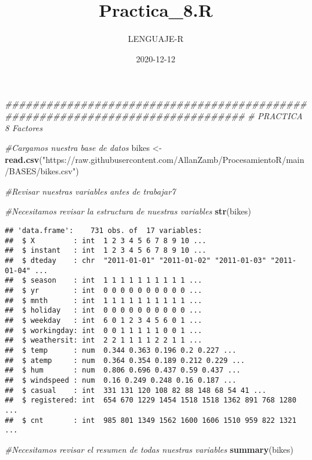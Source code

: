 \documentclass[
]{article}
\title{Practica\_8.R}
\author{LENGUAJE-R}
\date{2020-12-12}
\newenvironment{Shaded}{\begin{snugshade}}{\end{snugshade}}
\newcommand{\CommentTok}[1]{\textcolor[rgb]{0.56,0.35,0.01}{\textit{#1}}}
\newcommand{\KeywordTok}[1]{\textcolor[rgb]{0.13,0.29,0.53}{\textbf{#1}}}
\newcommand{\NormalTok}[1]{#1}
\newcommand{\StringTok}[1]{\textcolor[rgb]{0.31,0.60,0.02}{#1}}
\begin{document}
\maketitle

\begin{Shaded}
\begin{Highlighting}[]
\CommentTok{###############################################################################}
\CommentTok{# PRACTICA 8 Factores}

\CommentTok{#Cargamos nuestra base de datos}
\NormalTok{bikes <-}\StringTok{ }\KeywordTok{read.csv}\NormalTok{(}\StringTok{"https://raw.githubusercontent.com/AllanZamb/ProcesamientoR/main/BASES/bikes.csv"}\NormalTok{)}

\CommentTok{#Revisar nuestras variables antes de trabajar7}

\CommentTok{#Necesitamos revisar la estructura de nuestras variables}
\KeywordTok{str}\NormalTok{(bikes)}
\end{Highlighting}
\end{Shaded}

\begin{verbatim}
## 'data.frame':    731 obs. of  17 variables:
##  $ X         : int  1 2 3 4 5 6 7 8 9 10 ...
##  $ instant   : int  1 2 3 4 5 6 7 8 9 10 ...
##  $ dteday    : chr  "2011-01-01" "2011-01-02" "2011-01-03" "2011-01-04" ...
##  $ season    : int  1 1 1 1 1 1 1 1 1 1 ...
##  $ yr        : int  0 0 0 0 0 0 0 0 0 0 ...
##  $ mnth      : int  1 1 1 1 1 1 1 1 1 1 ...
##  $ holiday   : int  0 0 0 0 0 0 0 0 0 0 ...
##  $ weekday   : int  6 0 1 2 3 4 5 6 0 1 ...
##  $ workingday: int  0 0 1 1 1 1 1 0 0 1 ...
##  $ weathersit: int  2 2 1 1 1 1 2 2 1 1 ...
##  $ temp      : num  0.344 0.363 0.196 0.2 0.227 ...
##  $ atemp     : num  0.364 0.354 0.189 0.212 0.229 ...
##  $ hum       : num  0.806 0.696 0.437 0.59 0.437 ...
##  $ windspeed : num  0.16 0.249 0.248 0.16 0.187 ...
##  $ casual    : int  331 131 120 108 82 88 148 68 54 41 ...
##  $ registered: int  654 670 1229 1454 1518 1518 1362 891 768 1280 ...
##  $ cnt       : int  985 801 1349 1562 1600 1606 1510 959 822 1321 ...
\end{verbatim}

\begin{Shaded}
\begin{Highlighting}[]
\CommentTok{#Necesitamos revisar el resumen de todas nuestras variables}
\KeywordTok{summary}\NormalTok{(bikes)}
\end{Highlighting}
\end{Shaded}
\end{document}
